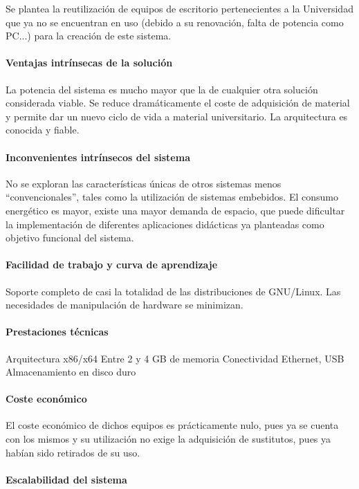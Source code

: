 Se plantea la reutilización de equipos de escritorio pertenecientes a la Universidad que ya no se encuentran en uso (debido a su renovación, falta de potencia como PC...) para la creación de este sistema.

\paragraph{Ventajas intrínsecas de la solución}
La potencia del sistema es mucho mayor que la de cualquier otra solución considerada viable. Se reduce dramáticamente el coste de adquisición de material y permite dar un nuevo ciclo de vida a material universitario.
La arquitectura es conocida y fiable.

\paragraph{Inconvenientes intrínsecos del sistema}

No se exploran las características únicas de otros sistemas menos ``convencionales'', tales como la utilización de sistemas embebidos. El consumo energético es mayor, existe una mayor demanda de espacio, que puede dificultar la implementación de diferentes aplicaciones didácticas ya planteadas como objetivo funcional del sistema.

\paragraph{Facilidad de trabajo y curva de aprendizaje}

Soporte completo de casi la totalidad de las distribuciones de GNU/Linux.
Las necesidades de manipulación de hardware se minimizan.

\paragraph{Prestaciones técnicas}
Arquitectura x86/x64
Entre 2 y 4 GB de memoria
Conectividad Ethernet, USB
Almacenamiento en disco duro
\paragraph{Coste económico}

El coste económico de dichos equipos es prácticamente nulo, pues ya se cuenta con los mismos y su utilización no exige la adquisición de sustitutos, pues ya habían sido retirados de su uso.

\paragraph{Escalabilidad del sistema}

